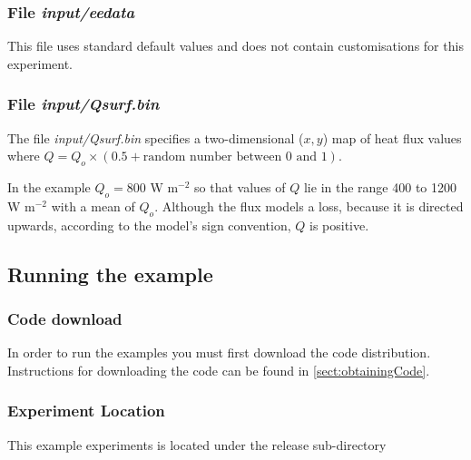 \subsubsection{File {\it input/eedata}}
\label{www:tutorials}

This file uses standard default values and does not contain
customisations for this experiment.


\subsubsection{File {\it input/Qsurf.bin}}
\label{www:tutorials}

The file {\it input/Qsurf.bin} specifies a two-dimensional ($x,y$) 
map of heat flux values where 
$Q = Q_o \times ( 0.5 + \mbox{random number between 0 and 1})$.

In the example $Q_o = 800$ W m$^{-2}$ so that values of $Q$ lie in the range 400 to
1200 W m$^{-2}$ with a mean of $Q_o$. Although the flux models a loss, because it is
directed upwards, according to the model's sign convention, $Q$ is positive.


\begin{figure}
\begin{center}
\end{center}
\caption{
}
\label{FIG:eg-bconv-Qsurf}
\end{figure}

\subsection{Running the example}
\label{www:tutorials}

\subsubsection{Code download}
\label{www:tutorials}

In order to run the examples you must first download the code distribution.
Instructions for downloading the code can be found in \ref{sect:obtainingCode}.

\subsubsection{Experiment Location}
\label{www:tutorials}

 This example experiments is located under the release sub-directory

